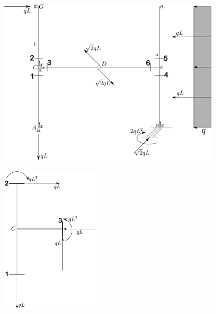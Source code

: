 \renewcommand{\thefigure}{12.2~-~4}
\begin{figure}[ht]
\centering
\includegraphics[width=\textwidth]{Immagini/Parte_12/Esercizio12_2/12_2_4.pdf}
\caption{}
\label{Esercizio12-2-4}
\end{figure}
\renewcommand{\thefigure}{12.2~-~5}
\begin{figure}[ht]
\centering
\includegraphics[width=0.45\textwidth]{Immagini/Parte_12/Esercizio12_2/12_2_5.pdf}
\caption{}
\label{Esercizio12-2-5}
\end{figure}
